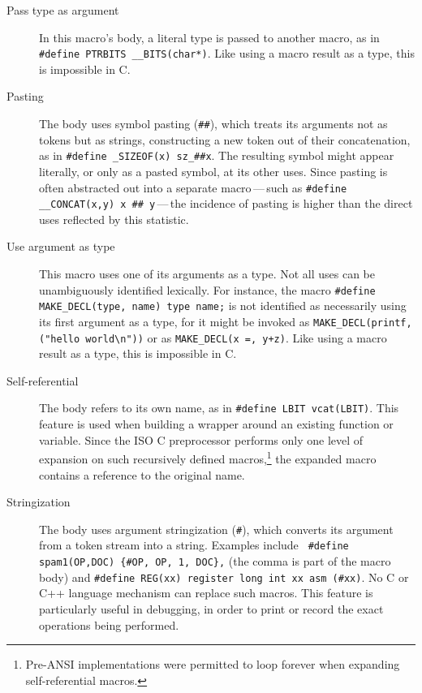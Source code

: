\begin{description}
\item[Pass type as argument]
  In this macro's body, a literal type is passed to another macro, as in
  {\tt \#define PTRBITS \verb|__BITS|(char*)}.  Like using a macro result
  as a type, this is impossible in C\@.

\item[Pasting]
  The body uses symbol pasting ({\tt \#\#}), which treats its arguments not
  as tokens but as strings, constructing a new token out of their
  concatenation, as in {\tt \#define \verb|_SIZEOF|(x) \verb|sz_|\#\#x}.
  The resulting symbol might appear literally, or only as a pasted symbol,
  at its other uses.  Since pasting is often abstracted out into a separate
  macro\,---\,such as {\tt \#define \verb|__CONCAT|(x,y) x \#\#
  y}\,---\,the incidence of pasting is higher than the direct uses
  reflected by this statistic.

\item[Use argument as type]
  This macro uses one of its arguments as a type.  Not all uses can be
  unambiguously identified lexically.  For instance, the macro 
  {\tt \#define \verb|MAKE_DECL|(type, name) type name;}
  is not identified as necessarily using its first argument as a type, for
  it might be invoked as {\tt \verb|MAKE_DECL|(printf, ("hello
  world\verb|\|n"))} or as {\tt \verb|MAKE_DECL|(x =, y+z)}.
  Like using a macro result
  as a type, this is impossible in C\@.

\item[Self-referential]
  The body refers to its own name, as in {\tt \#define LBIT vcat(LBIT)}.
  This feature is used when building a wrapper around an existing function
  or variable.  Since the ISO C preprocessor performs only one level of
  expansion on such recursively defined macros,\footnote{Pre-ANSI
    implementations were permitted to loop forever when expanding
    self-referential macros.} the expanded macro contains a reference to
  the original name.

\item[Stringization]
  The body uses argument stringization ({\tt \#}), which converts its
  argument from a token stream into a string.  Examples include {\tt
  \#define spam1(OP,DOC) \verb|{|\#OP, OP, 1, DOC\verb|}|,} (the comma is
part of the macro body) and {\tt \#define REG(xx) register long int xx asm
(\#xx)}.  No C or C++ language mechanism can replace such macros.  This
feature is particularly useful in debugging, in order to print or record
the exact operations being performed.

\end{description}

